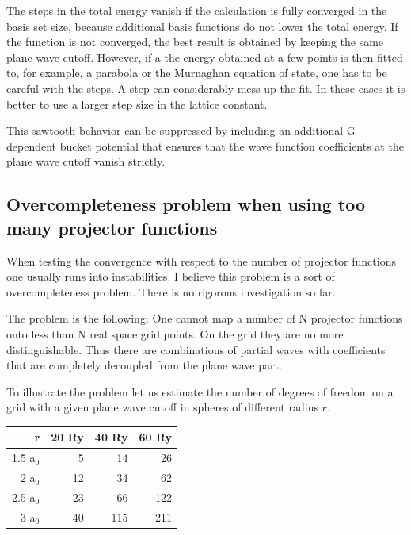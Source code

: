 \documentclass[final,12pt,makeidx,DIV=calc]{article}
\begin{document}
{{{{{{The steps in the total energy vanish if the calculation is fully converged in
the basis set size, because additional basis functions do not lower the total
energy. If the function is not converged, the best result is obtained by
keeping the same plane wave cutoff. However, if a the energy obtained at a few
points is then fitted to, for example, a parabola or the Murnaghan equation of
state\cite{murnaghan44_pnas30_244}, one has to be careful with the steps. A
step can considerably mess up the fit. In these cases it is better to use a
larger step size in the lattice constant.

This sawtooth behavior can be suppressed by including an additional
G-dependent bucket potential that ensures that the wave function
coefficients at the plane wave cutoff vanish strictly.



\subsection{Overcompleteness problem when using too many projector functions}
When testing the convergence with respect to the number of projector
functions one usually runs into instabilities. I believe this problem
is a sort of overcompleteness problem. There is no rigorous
investigation so far.

The problem is the following: One cannot map a number of N projector
functions onto less than N real space grid points. On the grid they
are no more distinguishable. Thus there are combinations of partial
waves with coefficients that are completely decoupled from the plane
wave part. 

To illustrate the problem let us estimate the number of degrees of
freedom on a grid with a given plane wave cutoff in spheres of
different radius $r$.

\begin{center}
\begin{tabular}{|r|r|r|r|}
\hline
r      & 20 Ry & 40 Ry & 60 Ry \\
\hline
1.5 a$_0$ &  5 &  14 &  26 \\
2   a$_0$& 12 &  34 &  62 \\
2.5 a$_0$& 23 &  66 &  122\\
3   a$_0$& 40 & 115 & 211 \\
\hline
\end{tabular}
\end{center}

}}}}}}
\end{document}

